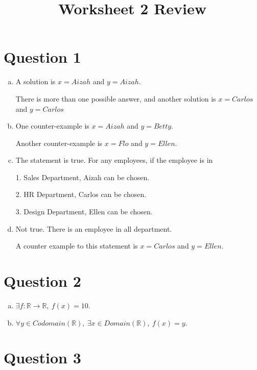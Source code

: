 \documentclass[12pt]{article}
\begin{document}
\title{Worksheet 2 Review}
\maketitle

\section*{Question 1}
\begin{enumerate}[a.]
    \item

    A solution is $x = Aizah$ and $y = Aizah$.

    \bigskip

    There is more than one possible answer, and another solution is $x = Carlos$
    and $y = Carlos$

    \item

    One counter-example is $x = Aizah$ and $y = Betty$.

    \bigskip

    Another counter-example is $x = Flo$ and $y = Ellen$.

    \item

    The statement is true. For any employees, if the employee is in

    \bigskip

    1. Sales Department, Aizah can be chosen.

    2. HR Department, Carlos can be chosen.

    3. Design Department, Ellen can be chosen.

    \item

    Not true. There is an employee in all department.

    \bigskip

    A counter example to this statement is $x = Carlos$ and $y = Ellen$.

\end{enumerate}

\section*{Question 2}
\begin{enumerate}[a.]
    \item

    $\exists f: \mathbb{R} \to \mathbb{R},\: f(x) = 10$.

    \item

    $\forall y \in Codomain(\mathbb{R}),\:\exists x \in Domain(\mathbb{R}),\:
    f(x) = y$.

\end{enumerate}

\section*{Question 3}
\end{document}
